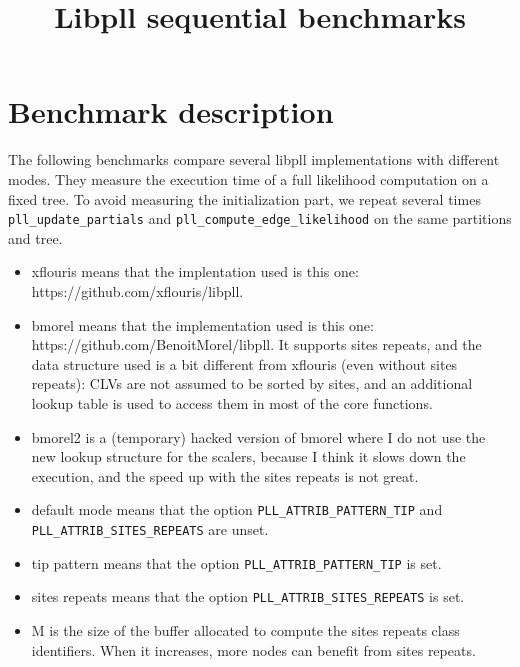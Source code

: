 \documentclass[a4paper]{article}
\begin{document}
\newcommand*{\figuretitle}[1]{%
    {\centering%
    \textbf{#1}%
    \par\medskip}%
}


\title{Libpll sequential benchmarks}
\maketitle


\section{Benchmark description}

The following benchmarks compare several libpll implementations with different modes. They measure the execution time of a full likelihood computation on a fixed tree. To avoid measuring the initialization part, we repeat several times  \texttt{pll\_update\_partials} and \texttt{pll\_compute\_edge\_likelihood} on the same partitions and tree.

\begin{itemize}
\item xflouris means that the implentation used is this one: \\ https://github.com/xflouris/libpll.
\item bmorel means that the implementation  used is this one: \\ https://github.com/BenoitMorel/libpll. It supports sites repeats, and the data structure used is a bit different from xflouris (even without sites repeats): CLVs are not assumed to be sorted by sites, and an additional lookup table is used to access them in most of the core functions.
\item bmorel2 is a (temporary) hacked version of bmorel where I do not use the new lookup structure for the scalers, because I think it slows down the execution, and the speed up with the sites repeats is not great.
\item default mode means that the option \texttt{PLL\_ATTRIB\_PATTERN\_TIP} and \texttt{PLL\_ATTRIB\_SITES\_REPEATS} are unset.
\item tip pattern means that the option \texttt{PLL\_ATTRIB\_PATTERN\_TIP} is set.
\item sites repeats means that the option \texttt{PLL\_ATTRIB\_SITES\_REPEATS} is set.
\item M is the size of the buffer allocated to compute the sites repeats class identifiers. When it increases, more nodes can benefit from sites repeats. 
\end{itemize}
\end{document}
